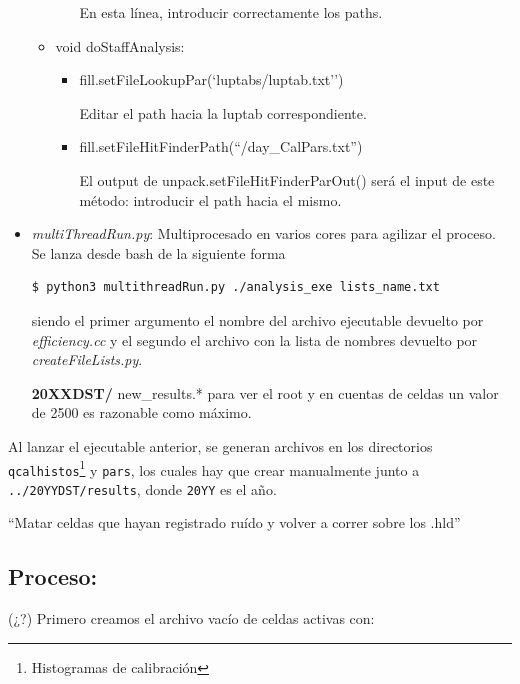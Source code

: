 \documentclass[a4paper]{book}
\begin{document}
\begin{itemize}
\begin{itemize}
\begin{itemize}
			En esta línea, introducir correctamente los paths.
		\end{itemize}
	\end{itemize}
	
	
	\begin{itemize}
		\item void doStaffAnalysis:
		\begin{itemize}
			\item fill.setFileLookupPar(`luptabs/luptab.txt'')
			
			Editar el path hacia la luptab correspondiente.
			
			\item fill.setFileHitFinderPath(``/day\_CalPars.txt'')
			
			El output de unpack.setFileHitFinderParOut() será el input de este método: introducir el path hacia el mismo.
		\end{itemize}
	\end{itemize}
	
	\item \textit{multiThreadRun.py}: Multiprocesado en varios cores para agilizar el proceso. Se lanza desde bash de la siguiente forma
	
	\begin{lstlisting}[language=bash]
$ python3 multithreadRun.py ./analysis_exe lists_name.txt
	\end{lstlisting}
	siendo el primer argumento el nombre del archivo ejecutable devuelto por \textit{efficiency.cc} y el segundo el archivo con la lista de nombres devuelto por \textit{createFileLists.py}.
	
	\textbf{20XXDST/} new\_results.* para ver el root y en cuentas de celdas un valor de 2500 es razonable como máximo.
\end{itemize}

Al lanzar el ejecutable anterior, se generan archivos en los directorios \texttt{qcalhistos}\footnote{Histogramas de calibración} y \texttt{pars}, los cuales hay que crear manualmente junto a \texttt{../20YYDST/results}, donde \texttt{20YY} es el año.

``Matar celdas que hayan registrado ruído y volver a correr sobre los .hld''

\subsection{Proceso:}

(¿?) Primero creamos el archivo vacío de celdas activas con:
\end{document}
